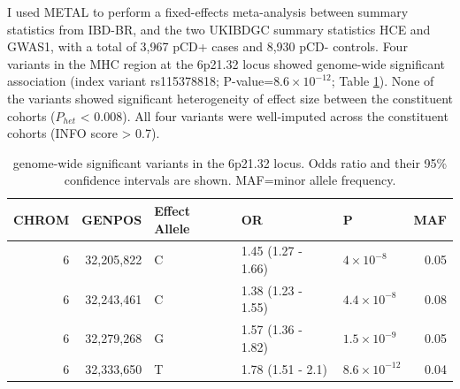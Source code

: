 I used METAL to perform a fixed-effects meta-analysis between summary statistics from IBD-BR, and the two UKIBDGC summary statistics HCE and GWAS1, with a total of 3,967 pCD+ cases and 8,930 pCD- controls. 
  Four variants in the MHC region at the 6p21.32 locus showed genome-wide significant association (index variant rs115378818; P-value=$8.6\times10^{-12}$; Table \ref{table:gws}). None of the variants showed significant heterogeneity of effect size between the constituent cohorts ($P_{het}$ < 0.008). All four variants were well-imputed across the constituent cohorts (INFO score > 0.7).
  \begin{table}[H]
    \caption{genome-wide significant variants in the 6p21.32 locus. Odds ratio and their 95\% confidence intervals are shown. MAF=minor allele frequency.}
    \label{table:gws}
    \centering\begingroup\fontsize{10}{12}\selectfont
    
    \begin{tabular}[t]{|r|r|l|l|l|r|}
    \hline
    CHROM & GENPOS & Effect Allele & OR & P & MAF\\
    \hline
    6 & 32,205,822 & C & 1.45 (1.27 - 1.66) & $4\times10^{-8}$ & 0.05\\
    \hline
    6 & 32,243,461 & C & 1.38 (1.23 - 1.55) & $4.4\times10^{-8}$ & 0.08\\
    \hline
    6 & 32,279,268 & G & 1.57 (1.36 - 1.82) & $1.5\times10^{-9}$ & 0.05\\
    \hline
    6 & 32,333,650 & T & 1.78 (1.51 - 2.1) & $8.6\times10^{-12}$ & 0.04\\
    \hline
    \end{tabular}
    \endgroup{}
    \end{table}

